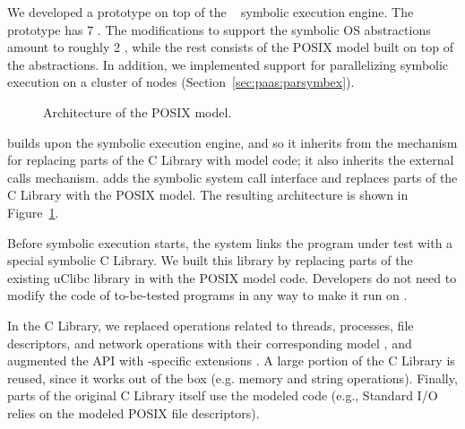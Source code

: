 We developed a \cnine prototype on top of the \klee~\cite{klee} symbolic execution engine.  The prototype has 7 \kloc.
%
The \klee modifications to support the symbolic OS abstractions amount to roughly 2 \kloc, while the rest consists of the POSIX model built on top of the abstractions.
%
In addition, we implemented support for parallelizing symbolic execution on a cluster of nodes (Section~\ref{sec:paas:parsymbex}).

\begin{figure}[h!]
  \centering
  \caption{Architecture of the \cnine POSIX model.}
  \label{fig:cloud9:posixmodel}
\end{figure}

\cnine builds upon the \klee symbolic execution engine, and so it inherits from \klee the mechanism for replacing parts of the C Library with model code; it also inherits the external calls mechanism.  \cnine adds the symbolic system call interface and replaces parts of the C Library with the POSIX model.  The resulting architecture is shown in Figure~\ref{fig:cloud9:posixmodel}.

\newcommand{\cI}{\!{\raisebox{-0.2ex}{\large\ding{192}}}\xspace}
\newcommand{\cII}{\!{\raisebox{-0.2ex}{\large\ding{193}}}\xspace}
\newcommand{\cIII}{\!{\raisebox{-0.2ex}{\large\ding{194}}}\xspace}
\newcommand{\cIV}{\!{\raisebox{-0.2ex}{\large\ding{195}}}\xspace}
\newcommand{\cV}{\!{\raisebox{-0.2ex}{\large\ding{196}}}\xspace}
\newcommand{\cVI}{\!{\raisebox{-0.2ex}{\large\ding{197}}}\xspace}
\newcommand{\cVII}{\!{\raisebox{-0.2ex}{\large\ding{198}}}\xspace}
\newcommand{\cVIII}{\!{\raisebox{-0.2ex}{\large\ding{199}}}\xspace}

Before symbolic execution starts, the \cnine system links the program under test with a special symbolic C Library.
%
We built this library by replacing parts of the existing uClibc library in \klee with the POSIX model code.  Developers do not need to modify the code of to-be-tested programs in any way to make it run on \cnine.  

In the C Library, we replaced operations related to threads, processes, file descriptors, and network operations with their corresponding model \cI, and augmented the API with \cnine-specific extensions \cII.
%
A large portion of the C Library is reused, since it works out of the box \cIII (e.g. memory and string operations).  Finally, parts of the original C Library itself use  the modeled code \cIV (e.g., Standard I/O  relies on the modeled POSIX file descriptors).

